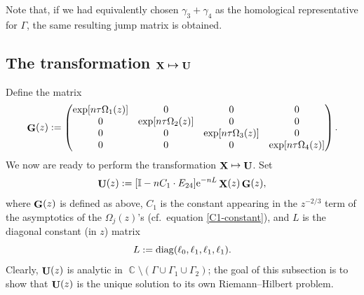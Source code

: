 \documentclass[10pt,a4paper]{amsart}
\DeclareMathOperator{\CC}{\mathbb{C}}
\DeclareMathOperator{\XX}{{\bf X}}
\DeclareMathOperator{\UU}{{\bf U}}
\DeclareMathOperator{\GG}{{\bf G}}
\numberwithin{equation}{section}
\begin{document}
\begin{Remark}
 Note that, if we had equivalently chosen $\gamma_3 + \gamma_4$ as the homological representative for $\Gamma$, the same resulting jump matrix is obtained.
\end{Remark}

\subsection[The transformation $\XX \mapsto \UU$]{The transformation $\boldsymbol{\XX \mapsto \UU}$}

Define the matrix
 \begin{equation*}%
 \GG(z) :=
 \begin{pmatrix}
 \exp[n\tau\Omega_1(z)] & 0 & 0 & 0\\
 0 & \exp[n\tau\Omega_2(z)] & 0 & 0\\
 0 & 0 & \exp[n\tau\Omega_3(z)] & 0\\
 0 & 0 & 0 & \exp[n\tau\Omega_4(z)]
 \end{pmatrix}.
 \end{equation*}
We now are ready to perform the transformation $\XX \mapsto \UU$. Set
 \begin{equation*}
 \UU(z) := [\mathbb{I} -nC_1\cdot E_{24}]{\rm e}^{-n L}\XX(z) \GG(z),
 \end{equation*}
where $\GG(z)$ is defined as above, $C_1$ is the constant appearing in the $z^{-2/3}$ term of the asymptotics of the $\Omega_j(z)$'s (cf.\ equation \eqref{C1-constant}), and $L$ is the diagonal constant (in $z$) matrix
 \begin{equation*}
 L := {\rm diag} (\ell_0, \ell_1, \ell_1, \ell_1).
 \end{equation*}
Clearly, $\UU(z)$ is analytic in $\CC \setminus (\Gamma \cup \Gamma_1 \cup \Gamma_2 )$; the goal of this subsection is to show that $\UU(z)$ is the unique solution
to its own Riemann--Hilbert problem.
\end{document}
